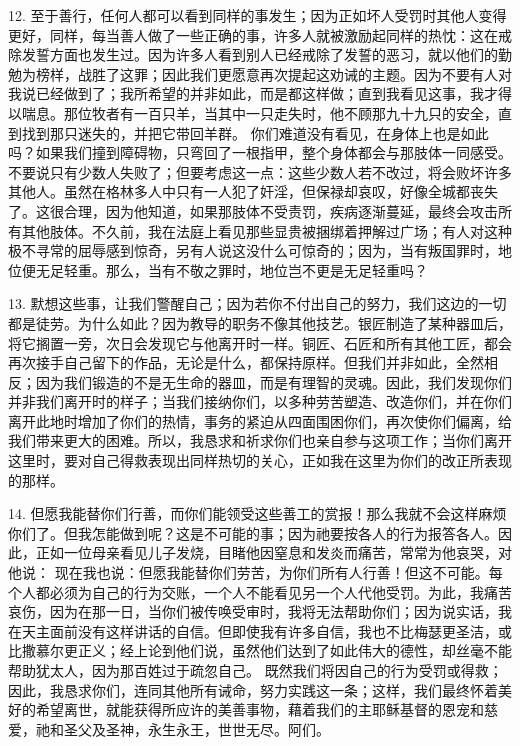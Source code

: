 12. 至于善行，任何人都可以看到同样的事发生；因为正如坏人受罚时其他人变得更好，同样，每当善人做了一些正确的事，许多人就被激励起同样的热忱：这在戒除发誓方面也发生过。因为许多人看到别人已经戒除了发誓的恶习，就以他们的勤勉为榜样，战胜了这罪；因此我们更愿意再次提起这劝诫的主题。因为不要有人对我说已经做到了；我所希望的并非如此，而是都这样做；直到我看见这事，我才得以喘息。那位牧者有一百只羊，当其中一只走失时，他不顾那九十九只的安全，直到找到那只迷失的，并把它带回羊群。 你们难道没有看见，在身体上也是如此吗？如果我们撞到障碍物，只弯回了一根指甲，整个身体都会与那肢体一同感受。不要说只有少数人失败了；但要考虑这一点：这些少数人若不改过，将会败坏许多其他人。虽然在格林多人中只有一人犯了奸淫，但保禄却哀叹，好像全城都丧失了。这很合理，因为他知道，如果那肢体不受责罚，疾病逐渐蔓延，最终会攻击所有其他肢体。不久前，我在法庭上看见那些显贵被捆绑着押解过广场；有人对这种极不寻常的屈辱感到惊奇，另有人说这没什么可惊奇的；因为，当有叛国罪时，地位便无足轻重。那么，当有不敬之罪时，地位岂不更是无足轻重吗？\par

13. 默想这些事，让我们警醒自己；因为若你不付出自己的努力，我们这边的一切都是徒劳。为什么如此？因为教导的职务不像其他技艺。银匠制造了某种器皿后，将它搁置一旁，次日会发现它与他离开时一样。铜匠、石匠和所有其他工匠，都会再次接手自己留下的作品，无论是什么，都保持原样。但我们并非如此，全然相反；因为我们锻造的不是无生命的器皿，而是有理智的灵魂。因此，我们发现你们并非我们离开时的样子；当我们接纳你们，以多种劳苦塑造、改造你们，并在你们离开此地时增加了你们的热情，事务的紧迫从四面围困你们，再次使你们偏离，给我们带来更大的困难。所以，我恳求和祈求你们也亲自参与这项工作；当你们离开这里时，要对自己得救表现出同样热切的关心，正如我在这里为你们的改正所表现的那样。\par

14. 但愿我能替你们行善，而你们能领受这些善工的赏报！那么我就不会这样麻烦你们了。但我怎能做到呢？这是不可能的事；因为祂要按各人的行为报答各人。因此，正如一位母亲看见儿子发烧，目睹他因窒息和发炎而痛苦，常常为他哀哭，对他说： 现在我也说：但愿我能替你们劳苦，为你们所有人行善！但这不可能。每个人都必须为自己的行为交账，一个人不能看见另一个人代他受罚。为此，我痛苦哀伤，因为在那一日，当你们被传唤受审时，我将无法帮助你们；因为说实话，我在天主面前没有这样讲话的自信。但即使我有许多自信，我也不比梅瑟更圣洁，或比撒慕尔更正义；经上论到他们说，虽然他们达到了如此伟大的德性，却丝毫不能帮助犹太人，因为那百姓过于疏忽自己。 既然我们将因自己的行为受罚或得救；因此，我恳求你们，连同其他所有诫命，努力实践这一条；这样，我们最终怀着美好的希望离世，就能获得所应许的美善事物，藉着我们的主耶稣基督的恩宠和慈爱，祂和圣父及圣神，永生永王，世世无尽。阿们。\par

